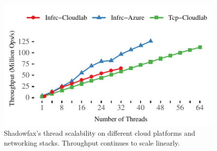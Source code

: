 \begin{figure}[t]
\centering
\includegraphics[width=0.9\columnwidth]{graphs/acceleration.pdf}
\caption{Shadowfax's thread scalability on different cloud platforms
         and networking stacks.
         Throughput continues to scale linearly.}
\label{fig:acceleration}
\end{figure}
